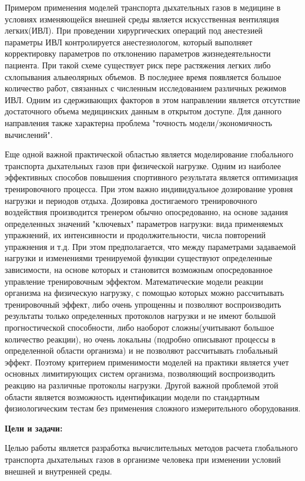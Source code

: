 Примером применения моделей транспорта дыхательных газов в медицине в условиях изменяющейся внешней среды является искусственная вентиляция легких(ИВЛ). При проведении хирургических операций под анестезией параметры ИВЛ контролируется анестезиологом, который выполняет корректировку параметров по отклонению параметров жизнедеятельности пациента. При такой схеме существует риск пере растяжения легких либо схлопывания альвеолярных объемов. В последнее время появляется большое количество работ, связанных с численным исследованием различных режимов ИВЛ. Одним из сдерживающих факторов в этом направлении является отсутствие достаточного объема медицинских данным в открытом доступе. Для данного направления также характерна проблема "точность модели/экономичность вычислений".   

Еще одной важной практической областью является моделирование глобального транспорта дыхательных газов при физической нагрузке. Одним из наиболее эффективных способов повышения спортивного результата является оптимизация тренировочного процесса. При этом важно индивидуальное дозирование уровня нагрузки и периодов отдыха. Дозировка достигаемого тренировочного воздействия производится тренером обычно опосредованно, на основе задания определенных значений "ключевых" параметров нагрузки: вида применяемых упражнений, их интенсивности и продолжительности, числа повторений упражнения и т.д. При этом предполагается, что между параметрами задаваемой нагрузки и изменениями тренируемой функции существуют определенные зависимости, на основе которых и становится возможным опосредованное управление тренировочным эффектом. Математические модели реакции организма на физическую нагрузку, с помощью которых можно рассчитывать тренировочный эффект, либо очень упрощенны и позволяют воспроизводить результаты только определенных протоколов нагрузки и не имеют большой прогностической способности, либо наоборот сложны(учитывают большое количество реакции), но очень локальны (подробно описывают процессы в определенной области организма) и не позволяют рассчитывать глобальный эффект. Поэтому критерием применимости моделей на практики является учет основных лимитирующих систем организма, позволяющий воспроизводить реакцию на различные протоколы нагрузки. Другой важной проблемой этой области является возможность идентификации модели по стандартным физиологическим тестам без применения сложного измерительного оборудования.         

\textbf{Цели и задачи:} 

Целью работы является разработка вычислительных методов расчета глобального транспорта дыхательных газов в организме человека при изменении условий внешней и внутренней среды.

